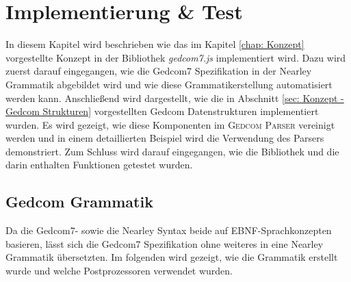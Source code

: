 \chapter{Implementierung \& Test}
\label{chap: Implementierung und Test}
In diesem Kapitel wird beschrieben wie das im Kapitel \ref{chap: Konzept} vorgestellte Konzept in der Bibliothek \textit{gedcom7.js} implementiert wird. Dazu wird zuerst darauf eingegangen, wie die Gedcom7 Spezifikation in der Nearley Grammatik abgebildet wird und wie diese Grammatikerstellung automatisiert werden kann. Anschließend wird dargestellt, wie die in Abschnitt \ref{sec: Konzept - Gedcom Strukturen} vorgestellten Gedcom Datenstrukturen implementiert wurden. Es wird gezeigt, wie diese Komponenten im \textsc{Gedcom Parser} vereinigt werden und in einem detaillierten Beispiel wird die Verwendung des Parsers demonstriert. Zum Schluss wird darauf eingegangen, wie die Bibliothek und die darin enthalten Funktionen getestet wurden.

\section{Gedcom Grammatik}
\label{sec: Implementierung - Gedcom Grammatik}
Da die Gedcom7- sowie die Nearley Syntax beide auf EBNF-Sprachkonzepten basieren, lässt sich die Gedcom7 Spezifikation ohne weiteres in eine Nearley Grammatik übersetzten. Im folgenden wird gezeigt, wie die Grammatik erstellt wurde und welche Postprozessoren verwendet wurden. 

